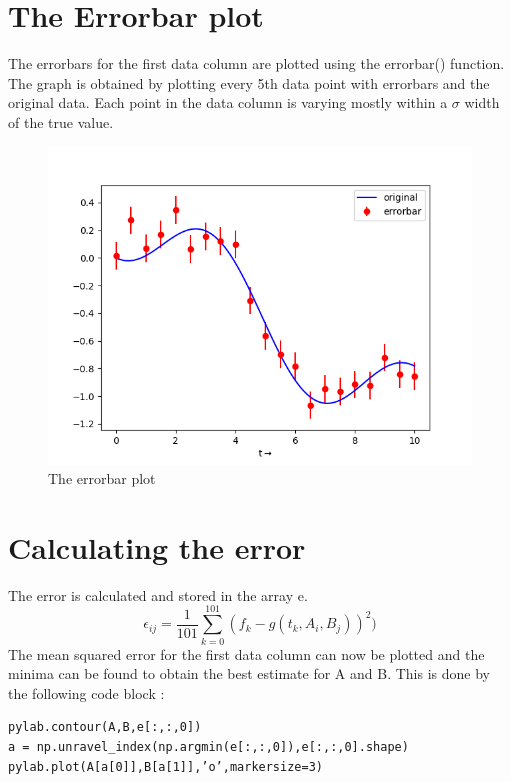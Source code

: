 \documentclass[11pt, a4paper]{article}
\begin{document}
\section{The Errorbar plot}
The errorbars for the first data column are plotted using the
errorbar() function. The graph is obtained by plotting every 5th data point
with errorbars and the original data. Each point in the data column is varying mostly within a $\sigma$ width of the true value.
\begin{figure}[!tbh]
   	\centering
   	\includegraphics[scale=0.5]{errorbar_plot.png}  %
   	\caption{The errorbar plot}
   	\label{fig:fig2}
   \end{figure} 
   
\section{Calculating the error}
The error is calculated and stored in the array e.
\begin{equation}
  \epsilon_{ij} = \frac{1}{101}\sum_{k=0}^{101}(f_k - g(t_k, A_i, B_j))^2)
\end{equation}{}
The mean squared error for the first data column can now be plotted and the minima can be found to obtain the best estimate for A and B. This is done by the following code block : 
\begin{verbatim}	
pylab.contour(A,B,e[:,:,0])
a = np.unravel_index(np.argmin(e[:,:,0]),e[:,:,0].shape)
pylab.plot(A[a[0]],B[a[1]],’o’,markersize=3)
\end{verbatim}
\end{document}
